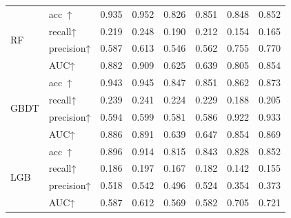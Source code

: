 \begin{table}[h]
{{\begin{tabular}{llllllll}
				\multirow{4}{*}{RF}             & acc~↑                    & 0.935 & 0.952                          & 0.826 & 0.851                                                                                    & 0.848 & 0.852                         \\
				& recall↑                  & 0.219 & 0.248                          & 0.190 & 0.212                                                                                    & 0.154 & 0.165                         \\
				& precision↑               & 0.587 & 0.613                          & 0.546 & 0.562                                                                                    & 0.755 & 0.770                         \\
				& AUC↑                     & 0.882 & 0.909                          & 0.625 & 0.639                                                                                    & 0.805 & 0.854                         \\
				\multirow{4}{*}{GBDT}           & acc~↑                    & 0.943 & 0.945                          & 0.847 & 0.851                                                                                    & 0.862 & 0.873                         \\
				& recall↑                  & 0.239 & 0.241                          & 0.224 & 0.229                                                                                    & 0.188 & 0.205                         \\
				& precision↑               & 0.594 & 0.599                          & 0.581 & 0.586                                                                                    & 0.922 & 0.933                         \\
				& AUC↑                     & 0.886 & 0.891                          & 0.639 & 0.647                                                                                    & 0.854 & 0.869                         \\
				\multirow{4}{*}{LGB}            & acc~↑                    & 0.896 & 0.914                          & 0.815 & 0.843                                                                                    & 0.828 & 0.852                         \\
				& recall↑                  & 0.186 & 0.197                          & 0.167 & 0.182                                                                                    & 0.142 & 0.155                         \\
				& precision↑               & 0.518 & 0.542                          & 0.496 & 0.524                                                                                    & 0.354 & 0.373                         \\
				& AUC↑                     & 0.587 & 0.612                          & 0.569 & 0.582                                                                                    & 0.705 & 0.721                         \\
				\toprule[1.5pt]
			\end{tabular}
		}
	}
\end{table}
